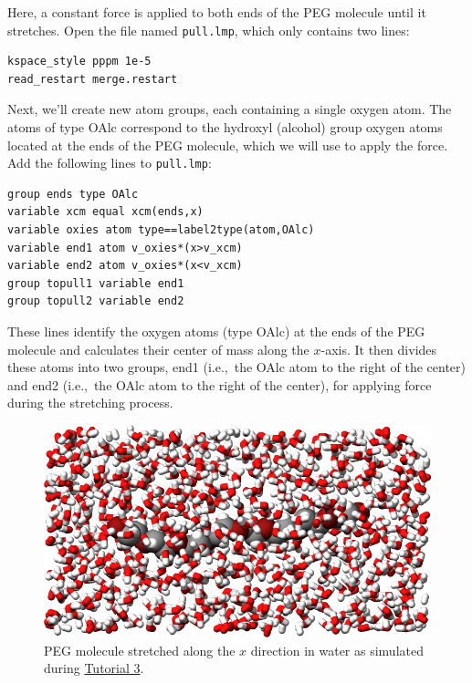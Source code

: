 \documentclass[9pt,tutorial]{livecoms}
\newcommand{\lmpcmd}[1]{\colorbox{listing}{\textcolor{command}{\small{#1}}}} %
\newcommand{\flecmd}[1]{\textcolor{command}{\texttt{#1}}} %
\begin{document}
Here, a constant force is applied to both ends of the PEG molecule until it
stretches.  Open the file named \flecmd{pull.lmp}, which
only contains two lines:
\begin{lstlisting}
kspace_style pppm 1e-5
read_restart merge.restart
\end{lstlisting}
Next, we'll create new atom groups, each containing a single oxygen atom.  The atoms of type OAlc
correspond to the hydroxyl (alcohol) group oxygen atoms located at the ends
of the PEG molecule, which we will use to apply the force.  Add the
following lines to \flecmd{pull.lmp}:
\begin{lstlisting}
group ends type OAlc
variable xcm equal xcm(ends,x)
variable oxies atom type==label2type(atom,OAlc)
variable end1 atom v_oxies*(x>v_xcm)
variable end2 atom v_oxies*(x<v_xcm)
group topull1 variable end1
group topull2 variable end2
\end{lstlisting}
These lines identify the oxygen atoms (type OAlc) at the ends of the PEG
molecule and calculates their center of mass along the $x$-axis.  It then
divides these atoms into two groups, \lmpcmd{end1} (i.e.,~the OAlc atom to
the right of the center) and \lmpcmd{end2} (i.e.,~the OAlc atom to the right
of the center), for applying force during the stretching process.

\begin{figure}
\centering
\includegraphics[width=\linewidth]{PEG-in-water}
\caption{PEG molecule stretched along the $x$ direction in water
as simulated during \hyperref[all-atom-label]{Tutorial 3}.}
\label{fig:PEG-in-water}
\end{figure}
\end{document}
